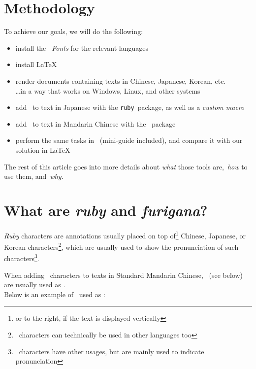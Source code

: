 \section*{Methodology}

To achieve our goals, we will do the following:

\begin{itemize}
	\item install the \emph{\Noto\ Fonts} for the relevant languages
	\item install \LaTeX
	\item render documents containing texts in Chinese, Japanese, Korean, etc.\\
		\phantom{MM}\dots in a way that works on Windows, Linux, and other systems
	\item add \furigana\ to text in Japanese with the \texttt{ruby} package, as well as a \emph{custom macro}
	\item add \ppinyin\ to text in Mandarin Chinese with the \xxpinyin package
	\item perform the same tasks in \LibreOffice\ (mini-guide included), and compare it with our solution in \LaTeX
\end{itemize}

The rest of this article goes into more details about \emph{what} those tools are, \emph{how} to use them, and \emph{why}.



\newpage

\section*{What are \emph{ruby} and \emph{furigana}?}

\emph{Ruby} characters are annotations usually placed on top of\footnote{or to the right, if the text is displayed vertically} Chinese, Japanese, or Korean characters\footnote{\rruby\ characters can technically be used in other languages too}, which are usually used to show the pronunciation of such characters\footnote{\rruby\ characters have other usages, but are mainly used to indicate pronunciation}. \\



When adding \rruby\ characters to texts in Standard Mandarin Chinese, \ppinyin\ (see below) are usually used as \rruby. \\


Below is an example of \ppinyin\ used as \rruby:

